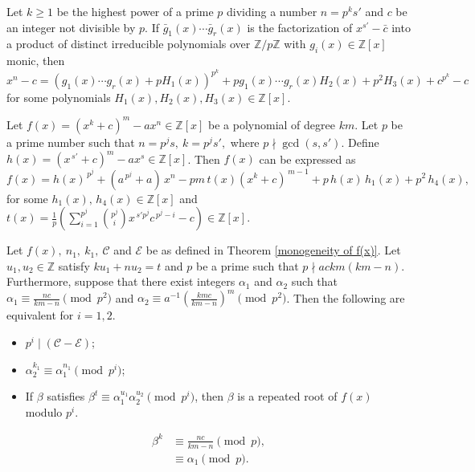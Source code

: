 \documentclass[10pt,a4paper]{amsart}
\newcommand{\Z}{\mathbb{Z}}
\newcommand{\calC}{\mathcal{C}}
\newcommand{\calE}{\mathcal{E}}
\begin{document}
\begin{lemma}\label{binomial expansion} { Let $k\geq 1$ be the highest power of a prime $p$ dividing a number $n=p^{k}s'$ and $c$ be an integer not divisible by $p$. If $\bar{g}_1(x)\cdots \bar{g}_r(x)$  is the factorization of $x^{s'}-\bar{c}$ into  a product of distinct irreducible polynomials over $\Z/p\Z$ with $g_i(x)\in\mathbb Z[x] $ monic, then 
		$$x^n-c=(g_1(x)\cdots g_r(x)+pH_1(x))^{p^k}+pg_1(x)\cdots g_r(x)H_2(x)+p^2H_3(x)+c^{p^k}-c$$ 
		\noindent for some polynomials  $H_1(x), H_2(x), H_3(x)\in \mathbb Z[x]$.}
\end{lemma}

\begin{lemma}\label{lemma:3.6}
	Let $f(x)=(x^k+c)^m-ax^n\in\Z[x]$ be a polynomial of degree $km$. Let $p$ be a prime number such that $n=p^js,~k=p^js',$ where $p\nmid\gcd(s,s')$. Define $h(x)=(x^{\,s'}+c)^m-ax^s\in\Z[x]$. Then $f(x)$ can be expressed as \[f(x) =  h(x)^{\,p^{j}}+(a^{\,p^{j}} + a)\,x^{n} - p m\, t(x)(x^{k} + c)^{\,m-1}+ p\,h(x)\,h_{1}(x) + p^{2}\,h_{4}(x),\] for some $h_1(x),\, h_4(x)\in\Z[x]$ and $t(x) = \frac{1}{p} \left( \sum_{i=1}^{p^{j}} \binom{p^{j}}{i} x^{\,s' p^{j}} c^{\,p^{j}-i} - c \right) \in \mathbb{Z}[x].$
\end{lemma}

\begin{proposition}\label{2.06}
	Let $f(x), ~n_1, ~k_1, ~\calC$ and $\calE$ be as defined in Theorem \ref{monogeneity of f(x)}. Let $u_1, u_2\in \Z$ satisfy $ ku_1+nu_2=t$ and $p$ be a prime such that $p\nmid ackm(km-n)$. Furthermore, suppose that there exist integers $ \alpha_1$ and $\alpha_2$ such that $\alpha_1 \equiv \frac{nc}{km-n} \pmod{p^2}$ and $\alpha_2\equiv a^{-1} \left(\frac{kmc}{km-n}\right)^m \pmod{p^2}$. Then the following are equivalent for $i=1,2$.
	\begin{itemize}
		\item[\textup{(i)}] $p^i\mid (\calC-\calE)$;
		\item [\textup{(ii)}] $\alpha_2^{k_1}\equiv\alpha_1^{n_1}\pmod{p^i}$;
		\item [\textup{(iii)}] If $\beta$ satisfies $\beta^t \equiv \alpha_1^{u_1} \alpha_2^{u_2} \pmod{p^i}$, then $\beta$ is a repeated root of $f(x)$ modulo $p^i$.
	\end{itemize}
\end{proposition}

		\begin{align}\label{0.009}
			\beta^k &\equiv \frac{nc}{km-n}\pmod{p},\nonumber\\
			&\equiv \alpha_1 \pmod{p}.
		\end{align}
\end{document}
